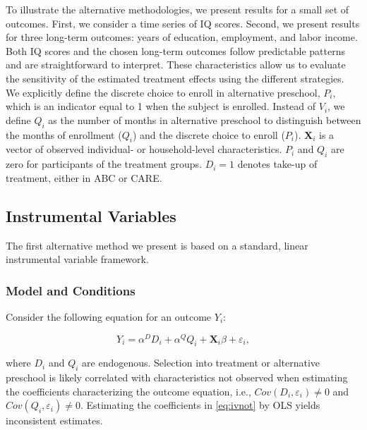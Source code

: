 \begin{appendices}
\noindent To illustrate the alternative methodologies, we present results for a small set of outcomes. First, we consider a time series of IQ scores. Second, we present results for three long-term outcomes: years of education, employment, and labor income. Both IQ scores and the chosen long-term outcomes follow predictable patterns and are straightforward to interpret. These characteristics allow us to evaluate the sensitivity of the estimated treatment effects using the different strategies.\\

\noindent We explicitly define the discrete choice to enroll in alternative preschool, $P_i$, which is an indicator equal to 1 when the subject is enrolled. Instead of $V_i$, we define $Q_i$ as the number of months in alternative preschool to distinguish between the months of enrollment ($Q_i$) and the discrete choice to enroll ($P_i$). $\mathbf{X}_{i}$ is a vector of observed individual- or household-level characteristics. $P_i$ and $Q_i$ are zero for participants of the treatment groups. $D_i=1$ denotes take-up of treatment, either in ABC or CARE.

\subsection{Instrumental Variables}

\noindent The first alternative method we present is based on a standard, linear instrumental variable framework.

\subsubsection{Model and Conditions}

\noindent Consider the following equation for an outcome $Y_{i}$:


\begin{equation}
Y_i = \alpha^D D_i + \alpha^Q Q_i + \mathbf{X}_i \beta + \varepsilon_i,
\label{eq:ivnot}
\end{equation}

\noindent where $D_{i}$ and $Q_{i}$ are endogenous. Selection into treatment or alternative preschool is likely correlated with characteristics not observed when estimating the coefficients characterizing the outcome equation, i.e., $Cov(D_i,\varepsilon_i) \neq 0$ and $Cov(Q_i,\varepsilon_i) \neq 0$. Estimating the coefficients in \eqref{eq:ivnot} by OLS yields inconsistent estimates.\\


\end{appendices}
